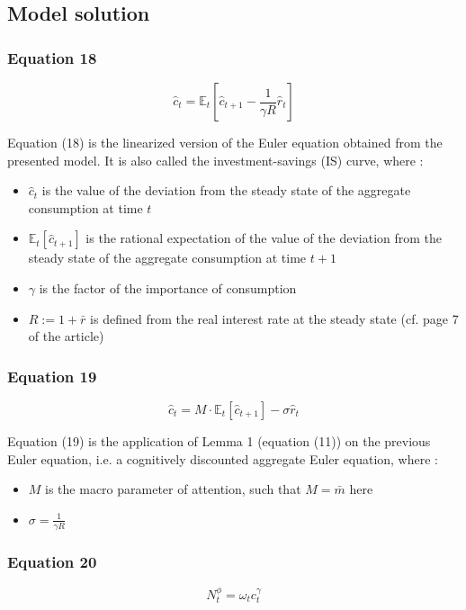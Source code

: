 \documentclass{article}
\begin{document}
\subsection{Model solution}

\subsubsection*{Equation 18}
\begin{equation}\tag{18}
    \hat{c}_{t}=\mathbb{E}_{t}\left[\hat{c}_{t+1}-\frac{1}{\gamma R}\hat{r}_{t}\right]
\end{equation}

Equation (18) is the linearized version of the Euler equation obtained from the presented model. It is also called the investment-savings (IS) curve, where : 
\begin{itemize}
    \item $\hat{c}_{t}$ is the value of the deviation from the steady state of the aggregate consumption at time $t$
    \item $\mathbb{E}_{t}\left[\hat{c}_{t+1}\right]$ is the rational expectation of the value of the deviation from the steady state of the aggregate consumption at time $t+1$
    \item $\gamma$ is the factor of the importance of consumption
    \item $R:=1+\bar{r}$ is defined from the real interest rate at the steady state (cf. page 7 of the article)
\end{itemize}

\subsubsection*{Equation 19}
\begin{equation}\tag{19}
    \hat{c}_{t}=M\cdot\mathbb{E}_{t}\left[\hat{c}_{t+1}\right]-\sigma\hat{r}_{t}
\end{equation}

Equation (19) is the application of Lemma 1 (equation (11)) on the previous Euler equation, i.e. a cognitively discounted aggregate Euler equation, where : 
\begin{itemize}
    \item $M$ is the macro parameter of attention, such that $M=\bar{m}$ here
    \item $\sigma=\frac{1}{\gamma R}$
\end{itemize}

\subsubsection*{Equation 20}
\begin{equation}\tag{20}
    N^{\phi}_{t}=\omega_{t}c_{t}^{\gamma}
\end{equation}
\end{document}
